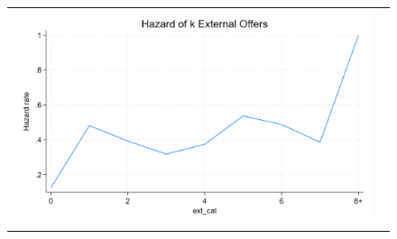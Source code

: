 \documentclass[12pt]{article}
\begin{document}
\begin{figure}[H]
\begin{figure}[H]
\begin{tabular}{cc}
\end{tabular}
\end{figure}




\end{figure}
\begin{figure}[H] \label{fig:ie2_}
\caption{}
\centering{}%
\begin{tabular}{cc}
\includegraphics[scale=0.27]{figures/IE2_hazard_number_extoffers.png}
\end{tabular}
\end{figure}
\end{document}
